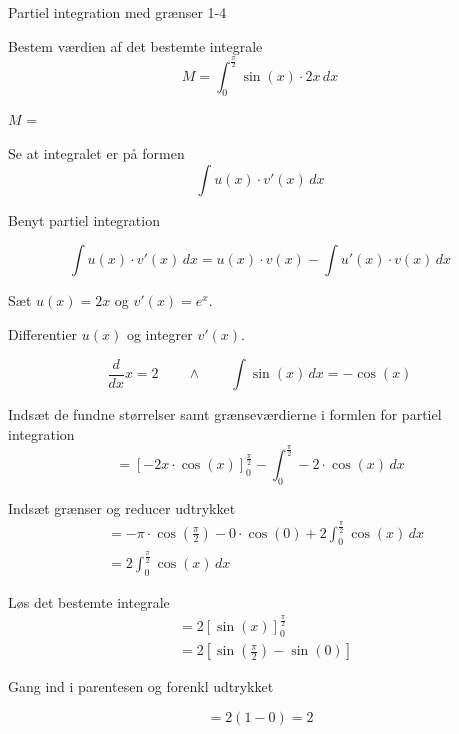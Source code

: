 \documentclass{article}
\begin{document}
\newpage

\begin{exercise}{Partiel integration med grænser 1-4}
	
	
	Bestem værdien af det bestemte integrale
	\[
	M = \int_0^{\frac{\pi}{2}} \sin(x) \cdot 2x \, dx
	\]
	
	$M$ =  
	
	
	\hint
	
	Se at integralet er på formen
	\[
	\int u(x) \cdot v'(x) \, dx
	\]
	
	\hint
	
	Benyt partiel integration
	
	\hint
	\[
	\int u(x) \cdot v'(x)\, dx = u(x) \cdot v(x) - \int u'(x) \cdot v(x) \, dx
	\]
	\hint
	
	Sæt $u(x) = 2x$ og $v'(x) = e^x$.
	
	
	\hint
	
	Differentier $u(x)$ og integrer $v'(x)$.
	
	\hint
	\[
	\frac{d}{dx}x = 2 \qquad \wedge \qquad \int \sin(x) \, dx = - \cos(x)
	\]
	
	\hint
	
	Indsæt de fundne størrelser samt grænseværdierne i formlen for partiel integration 
	\[
	= \left[-2x \cdot \cos(x) \right]_{0}^{\frac{\pi}{2}} - \int_{0}^{\frac{\pi}{2}} -2 \cdot \cos(x) \, dx 
	\]
	
	\hint
	
	Indsæt grænser og reducer udtrykket
	\begin{align*}
	&= - \pi \cdot \cos\left(\frac{\pi}{2}\right) - 0 \cdot \cos(0)  + 2 \int_{0}^{\frac{\pi}{2}} \cos(x) \, dx \\
	&=  2 \int_{0}^{\frac{\pi}{2}} \cos(x) \, dx 
	\end{align*}
	
	\hint
	Løs det bestemte integrale
	\begin{align*}
	&= 2 \left[ \sin(x) \right]_0^{\frac{\pi}{2}} \\
	&= 2 \left[ \sin\left(\frac{\pi}{2}\right) - \sin(0)  \right]
	\end{align*}
	
	\hint
	Gang ind i parentesen og forenkl udtrykket
	
	\hint
	\[
	= 2 ( 1 - 0) = 2 	
	\]
	
	
	
\end{exercise}

\newpage
\end{document}
